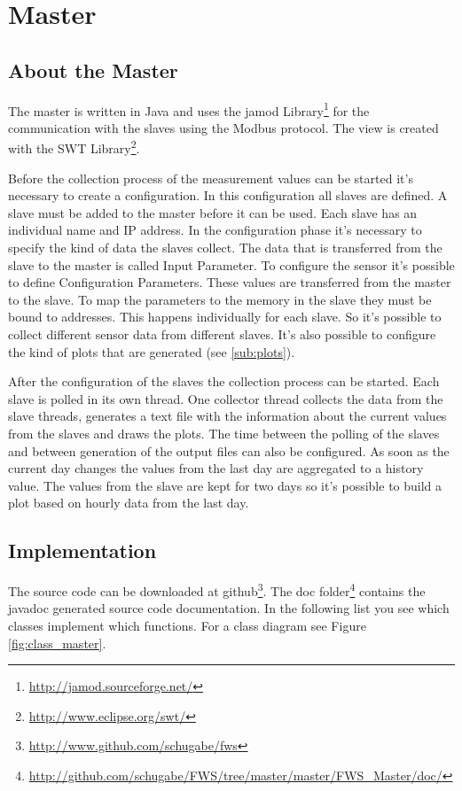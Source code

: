 
\chapter{Master}

\section{About the Master} %
\label{sec:about_the_master}
The master is written in Java and uses the jamod Library\footnote{\url{http://jamod.sourceforge.net/}} for the communication with the slaves using the Modbus protocol. The view is created with the SWT Library\footnote{\url{http://www.eclipse.org/swt/}}. 

Before the collection process of the measurement values can be started it's necessary to create a configuration. In this configuration all slaves are defined. A slave must be added to the master before it can be used. Each slave has an individual name and IP address. In the configuration phase it's necessary to specify the kind of data the slaves collect. The data that is transferred from the slave to the master is called Input Parameter. To configure the sensor it's possible to define Configuration Parameters. These values are transferred from the master to the slave. To map the parameters to the memory in the slave they must be bound to addresses. This happens individually for each slave. So it's possible to collect different sensor data from different slaves. It's also possible to configure the kind of plots that are generated (see \ref{sub:plots}).

After the configuration of the slaves the collection process can be started. Each slave is polled in its own thread. One collector thread collects the data from the slave threads, generates a text file with the information about the current values from the slaves and draws the plots. The time between the polling of the slaves and between generation of the output files can also be configured. As soon as the current day changes the values from the last day are aggregated to a history value. The values from the slave are kept for two days so it's possible to build a plot based on hourly data from the last day. 

\section{Implementation} %
\label{sec:implementation}
The source code can be downloaded at github\footnote{\url{http://www.github.com/schugabe/fws}}. The doc folder\footnote{\url{http://github.com/schugabe/FWS/tree/master/master/FWS_Master/doc/}} contains the javadoc generated source code documentation. In the following list you see which classes implement which functions. For a class diagram see Figure \ref{fig:class_master}.

